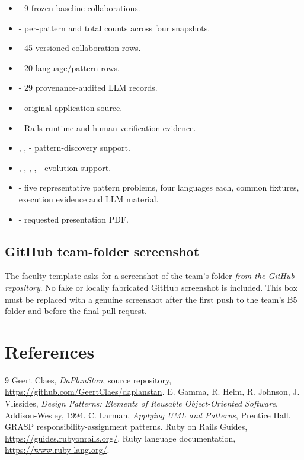 \documentclass[11pt,a4paper]{article}
\renewcommand{\_}{\textunderscore\allowbreak}
\begin{document}
\begin{itemize}
\item {} - 9 frozen baseline collaborations.
\item {} - per-pattern and total counts across four snapshots.
\item {} - 45 versioned collaboration rows.
\item {} - 20 language/pattern rows.
\item {} - 29 provenance-audited LLM records.
\item {} - original application source.
\item {} - Rails runtime and human-verification evidence.
\item {}, ,  - pattern-discovery support.
\item {}, , , ,  - evolution support.
\item {} - five representative pattern problems, four languages each, common fixtures, execution evidence and LLM material.
\item {} - requested presentation PDF.
\end{itemize}

\subsection{GitHub team-folder screenshot}
The faculty template asks for a screenshot of the team's folder \emph{from the GitHub repository}. No fake or locally fabricated GitHub screenshot is included. This box must be replaced with a genuine screenshot after the first push to the team's B5 folder and before the final pull request.

\begin{center}
\end{center}

\section{References}
\begin{thebibliography}{9}
 Geert Claes, \textit{DaPlanStan}, source repository, \url{https://github.com/GeertClaes/daplanstan}.
 E. Gamma, R. Helm, R. Johnson, J. Vlissides, \textit{Design Patterns: Elements of Reusable Object-Oriented Software}, Addison-Wesley, 1994.
 C. Larman, \textit{Applying UML and Patterns}, Prentice Hall. GRASP responsibility-assignment patterns.
 Ruby on Rails Guides, \url{https://guides.rubyonrails.org/}.
 Ruby language documentation, \url{https://www.ruby-lang.org/}.
\end{thebibliography}
\end{document}
